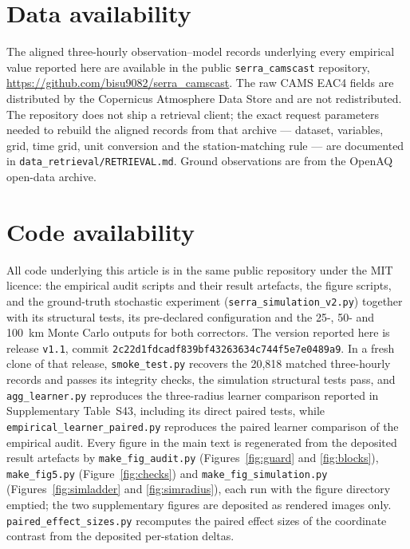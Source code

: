 \documentclass[preprint,12pt]{elsarticle}
\begin{document}
\section*{Data availability}
The aligned three-hourly observation--model records underlying every empirical value reported
here are available in the public \texttt{serra\_camscast} repository,
\url{https://github.com/bisu9082/serra_camscast}. The raw CAMS EAC4 fields are distributed by
the Copernicus Atmosphere Data Store and are not redistributed. The repository does not ship a
retrieval client; the exact request parameters needed to rebuild the aligned records from that
archive --- dataset, variables, grid, time grid, unit conversion and the station-matching rule ---
are documented in \texttt{data\_retrieval/RETRIEVAL.md}. Ground observations are from the OpenAQ
open-data archive.

\section*{Code availability}
All code underlying this article is in the same public repository under the MIT licence:
the empirical audit scripts and their result artefacts, the figure scripts, and the
ground-truth stochastic experiment (\texttt{serra\_simulation\_v2.py}) together with its
structural tests, its pre-declared configuration and the 25-, 50- and 100~km Monte Carlo
outputs for both correctors. The version reported here is release \texttt{v1.1}, commit
\texttt{2c22d1fdcadf839bf43263634c744f5e7e0489a9}. In a fresh clone of that release,
\texttt{smoke\_test.py} recovers the 20,818 matched three-hourly records and passes its
integrity checks, the simulation structural tests pass, and \texttt{agg\_learner.py}
reproduces the three-radius learner comparison reported in Supplementary Table~S43, including its direct paired tests, while \texttt{empirical\_learner\_paired.py} reproduces the paired learner comparison of the empirical audit. Every figure in the main text is
regenerated from the deposited result artefacts by \texttt{make\_fig\_audit.py}
(Figures~\ref{fig:guard} and \ref{fig:blocks}), \texttt{make\_fig5.py}
(Figure~\ref{fig:checks}) and \texttt{make\_fig\_simulation.py}
(Figures~\ref{fig:simladder} and \ref{fig:simradius}), each run with the figure directory
emptied; the two supplementary figures are deposited as rendered images only. \texttt{paired\_effect\_sizes.py} recomputes the paired effect sizes of the coordinate contrast from the deposited per-station deltas.



\end{document}

